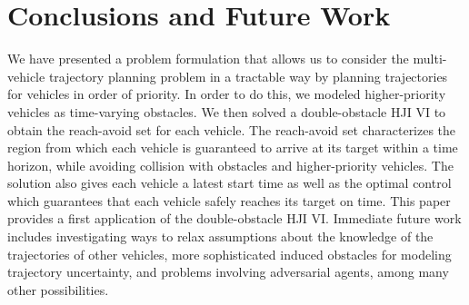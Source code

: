 \section{Conclusions and Future Work}
We have presented a problem formulation that allows us to consider the multi-vehicle trajectory planning problem in a tractable way by planning trajectories for vehicles in order of priority. In order to do this, we modeled higher-priority vehicles as time-varying obstacles. We then solved a double-obstacle HJI VI to obtain the reach-avoid set for each vehicle. The reach-avoid set characterizes the region from which each vehicle is guaranteed to arrive at its target within a time horizon, while avoiding collision with obstacles and higher-priority vehicles. The solution also gives each vehicle a latest start time as well as the optimal control which guarantees that each vehicle safely reaches its target on time. This paper provides a first application of the double-obstacle HJI VI. Immediate future work includes investigating ways to relax assumptions about the knowledge of the trajectories of other vehicles, more sophisticated induced obstacles for modeling trajectory uncertainty, and problems involving adversarial agents, among many other possibilities.